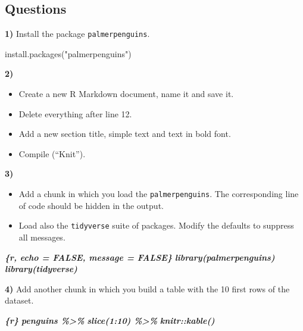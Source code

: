 \documentclass[
  12pt,
]{book}
\newenvironment{Shaded}{\begin{snugshade}}{\end{snugshade}}
\newcommand{\FunctionTok}[1]{\textcolor[rgb]{0.00,0.00,0.00}{#1}}
\newcommand{\InformationTok}[1]{\textcolor[rgb]{0.56,0.35,0.01}{\textbf{\textit{#1}}}}
\newcommand{\NormalTok}[1]{#1}
\newcommand{\StringTok}[1]{\textcolor[rgb]{0.31,0.60,0.02}{#1}}
\providecommand{\tightlist}{%
  \setlength{\itemsep}{0pt}\setlength{\parskip}{0pt}}
\begin{document}
\hypertarget{questions}{%
\subsection{Questions}\label{questions}}

\textbf{1)} Install the package \texttt{palmerpenguins}.

\begin{Shaded}
\begin{Highlighting}[]
\FunctionTok{install.packages}\NormalTok{(}\StringTok{"palmerpenguins"}\NormalTok{)}
\end{Highlighting}
\end{Shaded}

\textbf{2)}

\begin{itemize}
\tightlist
\item
  Create a new R Markdown document, name it and save it.
\item
  Delete everything after line 12.
\item
  Add a new section title, simple text and text in bold font.
\item
  Compile (``Knit'').
\end{itemize}

\textbf{3)}

\begin{itemize}
\tightlist
\item
  Add a chunk in which you load the \texttt{palmerpenguins}. The corresponding line of code should be hidden in the output.
\item
  Load also the \texttt{tidyverse} suite of packages. Modify the defaults to suppress all messages.
\end{itemize}

\begin{Shaded}
\begin{Highlighting}[]
\InformationTok{\textasciigrave{}\textasciigrave{}\textasciigrave{}\{r, echo = FALSE, message = FALSE\}}
\InformationTok{library(palmerpenguins)}
\InformationTok{library(tidyverse)}
\InformationTok{\textasciigrave{}\textasciigrave{}\textasciigrave{}}
\end{Highlighting}
\end{Shaded}

\textbf{4)} Add another chunk in which you build a table with the 10 first rows of the dataset.

\begin{Shaded}
\begin{Highlighting}[]
\InformationTok{\textasciigrave{}\textasciigrave{}\textasciigrave{}\{r\}}
\InformationTok{penguins \%\textgreater{}\%}
\InformationTok{  slice(1:10) \%\textgreater{}\%}
\InformationTok{  knitr::kable()}
\InformationTok{\textasciigrave{}\textasciigrave{}\textasciigrave{}}
\end{Highlighting}
\end{Shaded}
\end{document}
